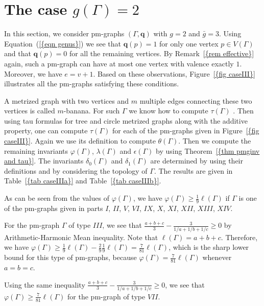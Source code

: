 \documentclass[12pt]{amsart}
\theoremstyle{example}
\theoremstyle{definition}
\theoremstyle{notation}
\begin{document}
\section{The case $g({\Gamma}) = 2$}\label{sec caseIII}

In this section, we consider pm-graphs $({\Gamma},{\textbf{q}})$ with $g=2$ and ${\bar{g}} =3$. Using {Equation~(\ref{{eqn genus}})} we see that
${\textbf{q}} (p)=1$ for only one vertex $p \in {V({\Gamma})}$ and that ${\textbf{q}} (p)=0$ for all the remaining vertices. By {Remark~\ref{{rem effective}}} again, such a pm-graph can have at most one vertex with valence exactly $1$. Moreover, we have $e=v+1$. Based on these observations,
{Figure~\ref{{fig caseIII}}} illustrates all the pm-graphs satisfying these conditions.

A metrized graph with two vertices and $m$ multiple edges connecting these two vertices is called $m$-banana. For such ${\Gamma}$ we know how to compute ${\tau(\Gamma)}$ \cite[Proposition 8.3]{C2}. Then using tau formulas for tree and circle metrized graphs along with the additive property, one can compute ${\tau(\Gamma)}$ for each of the pm-graphs given in {Figure~\ref{{fig caseIII}}}.
Again we use its definition to compute ${\theta ({\Gamma})}$. Then we compute the remaining invariants ${\varphi ({\Gamma})}$, ${\lambda ({\Gamma})}$ and ${\epsilon({\Gamma})}$ by using {Theorem~\ref{{thm pmginv and tau}}}.
The invariants $\delta_0({\Gamma})$ and $\delta_1({\Gamma})$ are determined by using their definitions and by considering the topology of ${\Gamma}$.
The results are given in {Table~\ref{{tab caseIIIa}}} and {Table~\ref{{tab caseIIIb}}}.

As can be seen from the values of ${\varphi ({\Gamma})}$, we have ${\varphi ({\Gamma})} \geq \frac{1}{9} {\ell ({\Gamma})}$ if ${\Gamma}$ is one of the pm-graphs given in parts $I$, $II$,
$V$, $VI$, $IX$, $X$, $XI$, $XII$, $XIII$, $XIV$.

For the pm-graph ${\Gamma}$ of type $III$, we see that $\frac{a+b+c}{3}-\frac{3}{1/a+1/b+1/c} \geq 0$ by Arithmetic-Harmonic Mean inequality. Note that ${\ell ({\Gamma})} = a+b+c$. Therefore, we have ${\varphi ({\Gamma})} \geq \frac{1}{9} {\ell ({\Gamma})} - \frac{2}{9} \frac{1}{9} {\ell ({\Gamma})} = \frac{7}{81} {\ell ({\Gamma})}$, which is the sharp lower bound for this type of pm-graphs, because  ${\varphi ({\Gamma})} = \frac{7}{81} {\ell ({\Gamma})}$ whenever $a=b=c$.

Using the same inequality $\frac{a+b+c}{3}-\frac{3}{1/a+1/b+1/c} \geq 0$, we see that  ${\varphi ({\Gamma})} \geq \frac{7}{81} {\ell ({\Gamma})}$ for the pm-graph of type $VII$.
\end{document}
